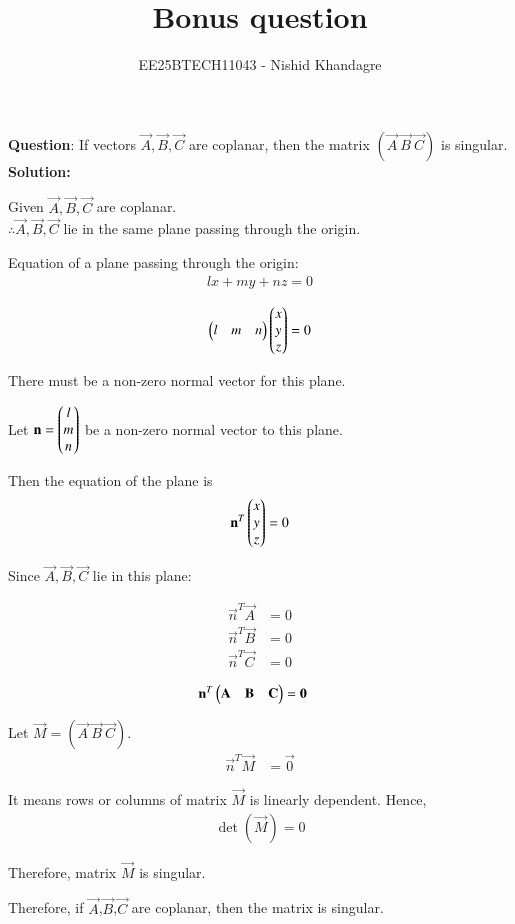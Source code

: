 \documentclass[journal]{IEEEtran}
\title{Bonus question}
\author{EE25BTECH11043 - Nishid Khandagre} %
\begin{document}
\maketitle

\renewcommand{\thefigure}{\theenumi}
\renewcommand{\thetable}{\theenumi}


\textbf{Question}:
If vectors $\vec{A}, \vec{B}, \vec{C}$ are coplanar, then the matrix $(\vec{A} \ \vec{B} \ \vec{C})$ is singular.
\\

\textbf{Solution: }

Given $\vec{A}, \vec{B}, \vec{C}$ are coplanar.\\

$\therefore \vec{A}, \vec{B}, \vec{C}$ lie in the same plane passing through the origin.


Equation of a plane passing through the origin:
\begin{align}
lx + my + nz = 0
\end{align}


\begin{align}
\begin{pmatrix}l & m & n\end{pmatrix} \begin{pmatrix}x \\ y \\ z\end{pmatrix} = 0
\end{align}

There must be a non-zero normal vector for this plane.

Let $\mathbf{n} = \begin{pmatrix}l \\ m \\ n\end{pmatrix}$ be a non-zero normal vector to this plane.

Then the equation of the plane is
\begin{align}
\mathbf{n}^T \begin{pmatrix}x \\ y \\ z\end{pmatrix} = 0
\end{align}

Since $\vec{A}, \vec{B}, \vec{C}$ lie in this plane:


\begin{align}
\vec{n}^T \vec{A} &= 0 \\
\vec{n}^T \vec{B} &= 0 \\
\vec{n}^T \vec{C} &= 0
\end{align}


\begin{align}
\mathbf{n}^T \begin{pmatrix} \mathbf{A} & \mathbf{B} & \mathbf{C} \end{pmatrix} &= \mathbf{0}
\end{align}



Let $\vec{M} = (\vec{A} \ \vec{B} \ \vec{C})$.
\begin{align}
\vec{n}^T \vec{M} &= \vec{0}
\end{align}

It means rows or columns of matrix $\vec{M}$ is linearly dependent.
Hence,
\begin{align}
\det(\vec{M}) = 0
\end{align}

Therefore, matrix $\vec{M}$ is singular.

Therefore, if $\vec{A}$,$\vec{B}$,$\vec{C}$ are coplanar, then the matrix  is singular.
\end{document}
